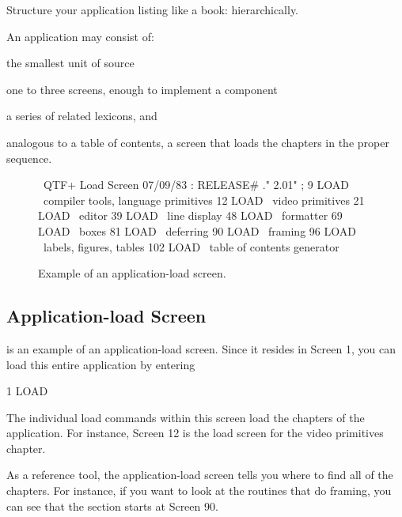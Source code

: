 \begin{tip}
Structure your application listing like a book: hierarchically.
\end{tip}
An application may consist of:

\begin{description}\parsep=0pt\itemsep=0pt
\item[Screens:] the smallest unit of \Forth{} source
\item[Lexicons:] one to three screens, enough to
implement a component
\item[Chapters:] a series of related lexicons, and
\item[Load screens:] analogous to a table of contents, a screen that
loads the chapters in the proper sequence.
\end{description}


\begin{figure*}[tttt]
\caption{Example of an application-load screen.}
\setcounter{screen}{1}
\begin{Screen}
\ QTF+ Load Screen                                      07/09/83
: RELEASE#   ." 2.01" ;
  9 LOAD  \ compiler tools, language primitives
 12 LOAD  \ video primitives
 21 LOAD  \ editor
 39 LOAD  \ line display
 48 LOAD  \ formatter
 69 LOAD  \ boxes
 81 LOAD  \ deferring
 90 LOAD  \ framing
 96 LOAD  \ labels, figures, tables
102 LOAD  \ table of contents generator




\end{Screen}
\end{figure*}

\subsection{Application-load Screen}

 is an example of an application-load screen.  Since it
resides in Screen 1, you can load this entire application by entering
\begin{Code}
1 LOAD
\end{Code}
The individual load commands within this screen load the chapters of
the application.  For instance, Screen 12 is the load screen for the
video primitives chapter.

As a reference tool, the application-load screen tells you where to
find all of the chapters.  For instance, if you want to look at the
routines that do framing, you can see that the section starts at
Screen 90.

